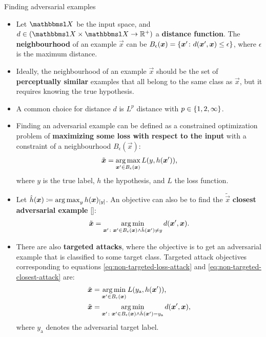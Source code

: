 \documentclass{beamer}
\newcommand{\citep}[1]{{\color{citecolor}\relscale{0.8}[\textcite{#1}]}}
\begin{document}
\begin{frame}[allowframebreaks=0.9]{Finding adversarial examples}
	\begin{itemize}
		\item Let $\set X$ be the input space,
		and $d\in(\set X\times\set X\to \R^+)$ a \textbf{distance function}. The \textbf{neighbourhood} of an example $\vec x$ can be $B_{\epsilon}(\vec x) = \cbr{\vec x'\colon d(\vec x', \vec x) \leq \epsilon}$,
		where $\epsilon$ is the maximum distance.
		
		\item Ideally, the neighbourhood of an example $\vec x$ should be the set of \textbf{perceptually similar} examples that all belong to the same class as $\vec x$, but it requires knowing the true hypothesis.
		\item A common choice for distance $d$ is $L^p$ distance with $p\in\cbr{1,2,\infty}$. 
	\item Finding an adversarial example can be defined as a constrained optimization problem of \textbf{maximizing some loss with respect to the input} with a constraint of a neighbourhood $B_\epsilon(\vec x)$:
	\begin{align}
	\tilde{\vec x} = \argmax_{\vec x'\in B_\epsilon(\vec x)} L(y, h(\vec x')) \text{,} \label{eq:non-targeted-loss-attack}
	\end{align}
	where $y$ is the true label, $h$ the hypothesis, and $L$ the loss function. 
	\item Let $\hat{h}(\vec x) \coloneqq \argmax_{y} h(\vec x)_\ind{y}$.
	An objective can also be to find the $\tilde{\vec x}$ \textbf{closest adversarial example} \citep{Moosavi-Dezfooli:2016:DFSAMFDNN}:
	\begin{align}
	\tilde{\vec x} = \argmin_{\vec x'\colon \vec x'\in B_\epsilon(\vec x) \land \hat{h}(\vec x') \neq y} d(\vec x', \vec x) \text{.} \label{eq:non-targeted-closest-attack}
	\end{align}
	\item There are also \textbf{targeted attacks}, where the objective is to get an adversarial example that is classified to some target class. Targeted attack objectives corresponding to equations \eqref{eq:non-targeted-loss-attack} and \eqref{eq:non-targeted-closest-attack} are:
	\begin{align}
	\tilde{\vec x} &= \argmin_{\vec x'\in B_\epsilon(\vec x)} L(y_\text{a}, h(\vec x')) \text{,} \label{eq:targeted-loss-attack} \\
	\tilde{\vec x} &= \argmin_{\vec x'\colon \vec x'\in B_\epsilon(\vec x) \land \hat{h}(\vec x') = y_\text{a}} d(\vec x', \vec x) \text{,} \label{eq:targeted-closest-attack}
	\end{align}
	where $y_\text{a}$ denotes the adversarial target label. 
\end{itemize}
\end{frame}
\end{document}
